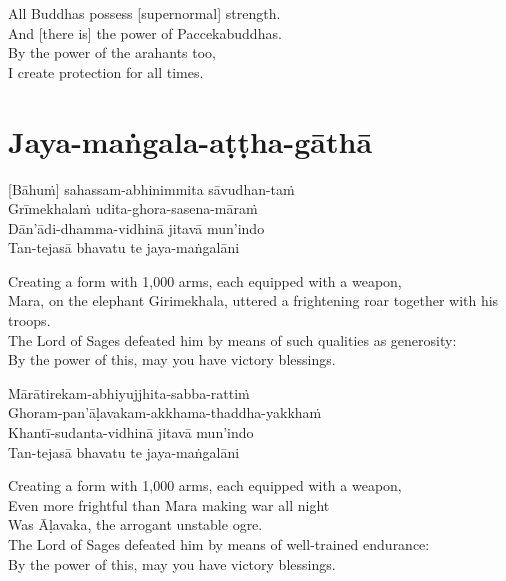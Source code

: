 \begin{english}
  All Buddhas possess [supernormal] strength.\\
  And [there is] the power of Paccekabuddhas.\\
  By the power of the arahants too,\\
  I create protection for all times.
\end{english}

\suttaRef{[MJG]}

\section{Jaya-maṅgala-aṭṭha-gāthā}
\label{jaya-mangala-attha-gatha}
[Bāhuṁ] sahassam-abhinimmita sāvudhan-taṁ\\
Grīmekhalaṁ udita-ghora-sasena-māraṁ\\
Dān'ādi-dhamma-vidhinā jitavā
mun'indo\\
Tan-tejasā bhavatu te jaya-maṅgalāni

\begin{english}
  Creating a form with 1,000 arms, each equipped with a weapon,\\
  Mara, on the elephant Girimekhala, uttered a frightening roar together with his troops.\\
  The Lord of Sages defeated him by means of such qualities as generosity:\\
  By the power of this, may you have victory blessings.
\end{english}

Mārātirekam-abhiyujjhita-sabba-rattiṁ\\
Ghoram-pan'āḷavakam-akkhama-thaddha-yakkhaṁ\\
Khantī-sudanta-vidhinā jitavā mun'indo\\
Tan-tejasā bhavatu te jaya-maṅgalāni

\begin{english}
  Creating a form with 1,000 arms, each equipped with a weapon,\\
  Even more frightful than Mara making war all night\\
  Was Āḷavaka, the arrogant unstable ogre.\\
  The Lord of Sages defeated him by means of well-trained endurance:\\
  By the power of this, may you have victory blessings.
\end{english}

